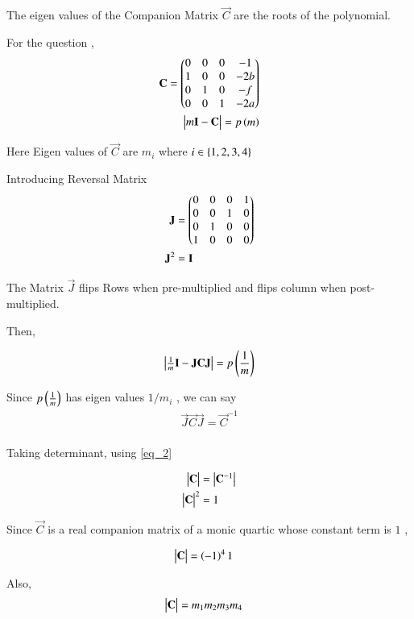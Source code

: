 \documentclass[journal]{IEEEtran}
\numberwithin{equation}{enumi}
\numberwithin{figure}{enumi}
\begin{document}
The eigen values of the Companion Matrix $\vec{C}$ are the roots of the polynomial.

For the question , 
\begin{align}
    \mathbf{C} = \begin{pmatrix}0&0&0&-1\\
                     1&0&0&-2b\\
                     0&1&0&-f\\
                     0&0&1&-2a\end{pmatrix}\\ 
    \begin{vmatrix}m\mathbf{I}- \mathbf{C}\end{vmatrix} = p\left(m\right)
\end{align}

Here Eigen values of $\vec{C}$ are $m_i$ where $i \in \left\{1,2,3,4\right\}$

Introducing Reversal Matrix 
\begin{align}
    \mathbf{J} &= \begin{pmatrix}0&0&0&1\\0&0&1&0\\0&1&0&0\\1&0&0&0\end{pmatrix} \\ 
    \mathbf{J}^2 &= \mathbf{I} \label{eq_2}
\end{align}

The Matrix $\vec{J}$ flips Rows when pre-multiplied and flips column when post-multiplied.

Then,

\begin{align}
    \begin{vmatrix}\frac{1}{m}\mathbf{I}-\mathbf{J}\mathbf{C}\mathbf{J}\end{vmatrix} = p\left(\frac{1}{m}\right)
\end{align}

Since $p\left(\frac{1}{m}\right)$ has eigen values $1/m_i$ , we can say 
\begin{align}
    \vec{J}\vec{C}\vec{J} = \vec{C}^{-1} \\
\end{align}

Taking determinant, using \ref{eq_2}

\begin{align}
    \begin{vmatrix}\mathbf{C}\end{vmatrix} &= \begin{vmatrix}\mathbf{C}^{-1}\end{vmatrix}\\
    \begin{vmatrix}\mathbf{C}\end{vmatrix}^2 &= 1 
\end{align}

Since $\vec{C}$ is a real companion matrix of a monic quartic whose constant term is $1$ , 

\begin{align}
    \begin{vmatrix}\mathbf{C}\end{vmatrix} &= \left(-1\right)^4 1 
\end{align}

Also, 
\begin{align}
    \begin{vmatrix}\mathbf{C}\end{vmatrix} &= m_1m_2m_3m_4
\end{align}
\end{document}
